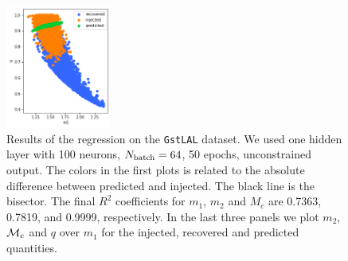 \documentclass[prd,aps,twocolumn,a4paper,showkeys,nofootinbib]{article}
\def\Mc{{\cal M}_c}
\begin{document}
\begin{figure}[]
  \includegraphics[width=0.31\textwidth]{./Figs/GstLAL_q.png}
  \caption{\label{fig:GstLAL_results} Results of the regression on the \texttt{GstLAL}
  dataset. We used one hidden layer with 100 neurons, $N_{\rm batch}=64$, 50 epochs,  
  unconstrained output.
  The colors in the first plots is related to the absolute difference between predicted 
  and injected. The black line is the bisector.
  The final $R^2$ coefficients for $m_1$, $m_2$ and $M_c$ 
  are 0.7363, 0.7819, and 0.9999, respectively.
  In the last three panels we plot $m_2$, $\Mc$ and $q$ over $m_1$ for the injected, recovered
  and predicted quantities.}
\end{figure}

\end{document}

